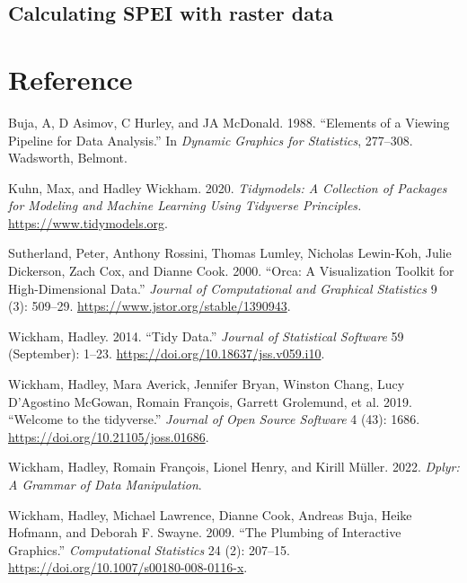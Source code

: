 \documentclass[
]{article}
\newlength{\cslhangindent}
\newlength{\cslentryspacingunit} %
\newenvironment{CSLReferences}[2] %
 {%
  \setlength{\parindent}{0pt}
  \ifodd #1
  \let\oldpar\par
  \def\par{\hangindent=\cslhangindent\oldpar}
  \fi
  \setlength{\parskip}{#2\cslentryspacingunit}
 }%
 {}
\begin{document}
\hypertarget{calculating-spei-with-raster-data}{%
\subsection{Calculating SPEI with raster
data}\label{calculating-spei-with-raster-data}}

\hypertarget{reference}{%
\section*{Reference}\label{reference}}

\hypertarget{refs}{}
\begin{CSLReferences}{1}{0}
\leavevmode{}%
Buja, A, D Asimov, C Hurley, and JA McDonald. 1988. {``Elements of a
Viewing Pipeline for Data Analysis.''} In \emph{Dynamic Graphics for
Statistics}, 277--308. Wadsworth, Belmont.

\leavevmode{}%
Kuhn, Max, and Hadley Wickham. 2020. \emph{Tidymodels: A Collection of
Packages for Modeling and Machine Learning Using Tidyverse Principles.}
\url{https://www.tidymodels.org}.

\leavevmode{}%
Sutherland, Peter, Anthony Rossini, Thomas Lumley, Nicholas Lewin-Koh,
Julie Dickerson, Zach Cox, and Dianne Cook. 2000. {``Orca: {A}
{Visualization} {Toolkit} for {High}-{Dimensional} {Data}.''}
\emph{Journal of Computational and Graphical Statistics} 9 (3): 509--29.
\url{https://www.jstor.org/stable/1390943}.

\leavevmode{}%
Wickham, Hadley. 2014. {``Tidy {Data}.''} \emph{Journal of Statistical
Software} 59 (September): 1--23.
\url{https://doi.org/10.18637/jss.v059.i10}.

\leavevmode{}%
Wickham, Hadley, Mara Averick, Jennifer Bryan, Winston Chang, Lucy
D'Agostino McGowan, Romain François, Garrett Grolemund, et al. 2019.
{``Welcome to the {tidyverse}.''} \emph{Journal of Open Source Software}
4 (43): 1686. \url{https://doi.org/10.21105/joss.01686}.

\leavevmode{}%
Wickham, Hadley, Romain François, Lionel Henry, and Kirill Müller. 2022.
\emph{Dplyr: A Grammar of Data Manipulation}.

\leavevmode{}%
Wickham, Hadley, Michael Lawrence, Dianne Cook, Andreas Buja, Heike
Hofmann, and Deborah F. Swayne. 2009. {``The Plumbing of Interactive
Graphics.''} \emph{Computational Statistics} 24 (2): 207--15.
\url{https://doi.org/10.1007/s00180-008-0116-x}.

\end{CSLReferences}
\end{document}
